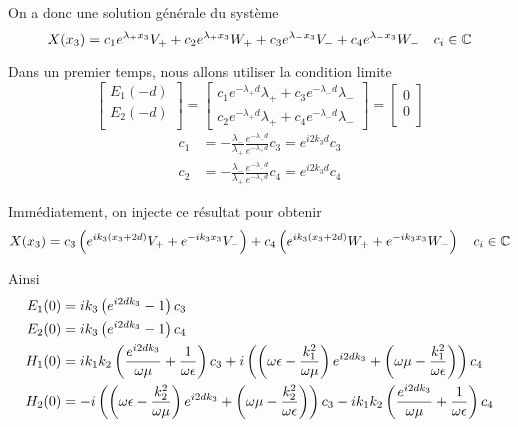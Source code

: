 On a donc une solution générale du système 
\begin{equation}
    X(x_3) = c_1e^{\lambda_+ x_3}V_+  + c_2e^{\lambda_+ x_3}W_+ + c_3e^{\lambda_- x_3}V_- +c_4e^{\lambda_- x_3}W_- \quad c_i \in \mathbb C
\end{equation}



Dans un premier temps, nous allons utiliser la condition limite 
\begin{equation}
    \begin{bmatrix}
        E_1(-d)\\
        E_2(-d)\\
    \end{bmatrix}
    =
    \begin{bmatrix}
        c_1 e^{-\lambda_+ d} \lambda_{+} + c_3 e^{-\lambda_- d} \lambda_{-} \\
        c_2 e^{-\lambda_+ d} \lambda_{+} + c_4 e^{-\lambda_- d} \lambda_{-}
    \end{bmatrix}
    =    
    \begin{bmatrix}
        0\\
        0\\
    \end{bmatrix}
\end{equation}
\begin{align}
    c_1 &= -\frac{\lambda_-}{\lambda_+}\frac{e^{-\lambda_-d}}{e^{-\lambda_+d}}c_3 = e^{i2k_3d}c_3\\
    c_2 &= -\frac{\lambda_-}{\lambda_+}\frac{e^{-\lambda_-d}}{e^{-\lambda_+d}}c_4 = e^{i2k_3d}c_4
\end{align}


Immédiatement, on injecte ce résultat pour obtenir
\begin{equation}
    X(x_3) = c_3\left(e^{ik_3(x_3 + 2d)}V_+ + e^{-ik_3x_3}V_- \right)  + c_4\left(e^{ik_3(x_3 + 2d)}W_+ + e^{-ik_3 x_3}W_- \right) \quad c_i \in \mathbb C
\end{equation}

Ainsi
\begin{align}
 E_1(0) &= ik_3\left(e^{i2dk_3} - 1\right)c_3 \\
 E_2(0) &= ik_3\left(e^{i2dk_3} - 1\right)c_4 \\
 H_1(0) &= 
     ik_1k_2\left(\dfrac{e^{i2dk_3}}{\omega\mu} + \dfrac{1}{\omega\epsilon}\right)c_3 
    + i\left( \left(\omega\epsilon-\dfrac{k_1^2}{\omega\mu}\right)e^{i2dk_3} + \left(\omega\mu-\dfrac{k_1^2}{\omega\epsilon}\right) \right)c_4 \\
 H_2(0) &=
    - i\left( \left(\omega\epsilon-\dfrac{k_2^2}{\omega\mu}\right)e^{i2dk_3} + \left(\omega\mu-\dfrac{k_2^2}{\omega\epsilon}\right) \right)c_3
    -i k_1k_2\left(\dfrac{e^{i2dk_3}}{\omega\mu} + \dfrac{1}{\omega\epsilon}\right)c_4
\end{align}


